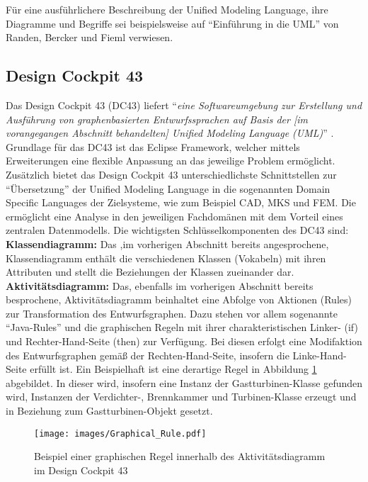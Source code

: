 Für eine ausführlichere Beschreibung der Unified Modeling Language, ihre Diagramme und Begriffe sei beispielsweise auf "`Einführung in die UML"' von Randen, Bercker und Fieml \cite{RBF16} verwiesen.

\subsection{Design Cockpit 43\textsuperscript{\textregistered}}
\label{subsec:DC43}
Das Design Cockpit 43\textsuperscript{\textregistered} (DC43) liefert "`\textit{eine Softwareumgebung zur Erstellung und Ausführung von graphenbasierten Entwurfssprachen auf Basis der [im vorangegangen Abschnitt behandelten] Unified Modeling Language (UML)}"' \cite{IIL17}. Grundlage für das DC43 ist das Eclipse Framework, welcher mittels Erweiterungen eine flexible Anpassung an das jeweilige Problem ermöglicht. Zusätzlich bietet das Design Cockpit 43\textsuperscript{\textregistered} unterschiedlichste Schnittstellen zur "`Übersetzung"' der Unified Modeling Language in die sogenannten Domain Specific Languages der Zielsysteme,  wie zum Beispiel CAD, MKS und FEM. Die ermöglicht eine Analyse in den jeweiligen Fachdomänen mit dem Vorteil eines zentralen Datenmodells. Die wichtigsten Schlüsselkomponenten des DC43 sind:\\

\textbf{Klassendiagramm:} Das ,im vorherigen Abschnitt bereits angesprochene, Klassendiagramm enthält die verschiedenen Klassen (Vokabeln) mit ihren Attributen und stellt die Beziehungen der Klassen zueinander dar.\\

\textbf{Aktivitätsdiagramm:} Das, ebenfalls im vorherigen Abschnitt bereits besprochene, Aktivitätsdiagramm beinhaltet eine Abfolge von Aktionen (Rules) zur Transformation des Entwurfsgraphen. Dazu stehen vor allem sogenannte "`Java-Rules"' und die graphischen Regeln mit ihrer charakteristischen Linker- (if) und Rechter-Hand-Seite (then) zur Verfügung. Bei diesen erfolgt eine Modifaktion des Entwurfsgraphen gemäß der Rechten-Hand-Seite, insofern die Linke-Hand-Seite erfüllt ist. Ein Beispielhaft ist eine derartige Regel in Abbildung \ref{img:Graphical_Rule} abgebildet. In dieser wird, insofern eine Instanz der Gastturbinen-Klasse gefunden wird, Instanzen der Verdichter-, Brennkammer und Turbinen-Klasse erzeugt und in Beziehung zum Gastturbinen-Objekt gesetzt.
 \begin{figure}
	\centering
	\texttt{[image: images/Graphical\_Rule.pdf]}
	\caption{Beispiel einer graphischen Regel innerhalb des Aktivitätsdiagramm im Design Cockpit 43 \textsuperscript{\textregistered}} \label{img:Graphical_Rule}
\end{figure}\\

